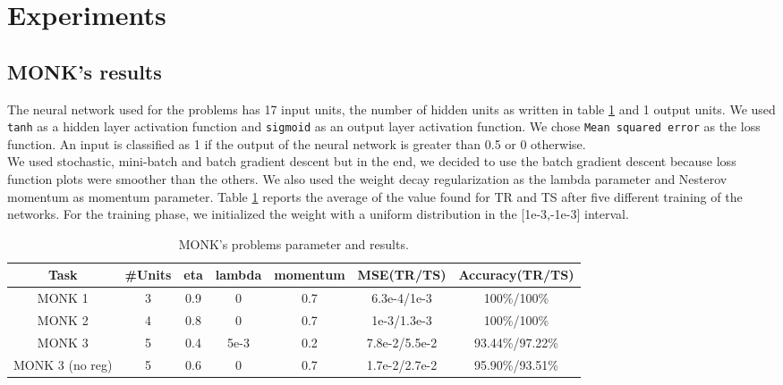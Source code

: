 \section{Experiments}


\subsection{MONK's results}

The neural network used for the problems has 17 input units, the number of hidden units as written in table \ref{tab:dati} and 1 output units. We used \texttt{tanh} as a hidden layer activation function and \texttt{sigmoid} as an output layer activation function. We chose \texttt{Mean squared error} as the loss function. An input is classified as 1 if the output of the neural network is greater than 0.5 or 0 otherwise.\\
We used stochastic, mini-batch and batch gradient descent but in the end, we decided to use the batch gradient descent because loss function plots were smoother than the others.
We also used the weight decay regularization as the lambda parameter and Nesterov momentum as momentum parameter. Table \ref{tab:dati} reports the average of the value found for TR and TS after five different training of the networks. For the training phase, we initialized the weight with a uniform distribution in the [1e-3,-1e-3] interval.    
\begin{center}
\small\addtolength{\tabcolsep}{-5pt}
\begin{table}[H]
\begin{tabular}{|c|c|c|c|c|c|c|}
\hline
\textbf{Task} &	\textbf{\#Units} &\textbf{ eta} & \textbf{lambda} &\textbf{momentum} & {\textbf{MSE(TR/TS)}} &\textbf{Accuracy(TR/TS)} \\ \hline
MONK 1        &    3 & 0.9 & 0 & 0.7  &   6.3e-4/1e-3 &   100\%/100\%  \\ \hline
MONK 2        &    4 & 0.8 & 0 & 0.7  &   1e-3/1.3e-3 &   100\%/100\% \\ \hline               
MONK 3        &    5 & 0.4 &5e-3 &0.2&     7.8e-2/5.5e-2&    93.44\%/97.22\%  \\ \hline
MONK 3 (no reg)&   5 & 0.6 &   0 &  0.7 &   1.7e-2/2.7e-2 & 95.90\%/93.51\%		\\ \hline              
\end{tabular}
\caption{MONK's problems parameter and results.}
\label{tab:dati}
\end{table}
\end{center}
